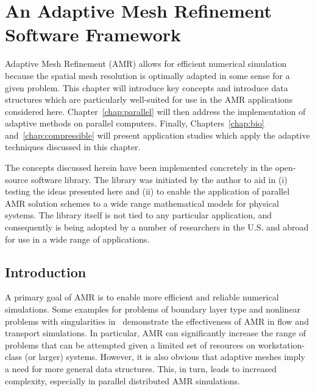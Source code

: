 \chapter{An Adaptive Mesh Refinement Software Framework\label{chap:amr}}

  Adaptive Mesh Refinement (AMR) allows for efficient numerical simulation because the spatial mesh resolution is optimally adapted in some sense for a given problem.   This chapter will introduce key concepts and introduce data structures which are particularly well-suited for use in the AMR applications considered here.  Chapter~\ref{chap:parallel} will then address the implementation of adaptive methods on parallel computers.  Finally, Chapters~\ref{chap:bio} and~\ref{chap:compressible} will present application studies which apply the adaptive techniques discussed in this chapter.

The concepts discussed herein have been implemented concretely in the \libMesh{} open-source software library.  The library was initiated by the author to aid in (i) testing the ideas presented here  and (ii) to enable the application of parallel AMR solution schemes to a wide range  mathematical models for physical systems.  The library itself is not tied to any particular application, and consequently is being adopted by a number of researchers in the U.S. and abroad for use in a wide range of applications.

\section{Introduction}

A primary goal of AMR is to enable more efficient and reliable numerical simulations.  Some
examples for problems of boundary layer type and nonlinear problems
with singularities in~\cite{carey_bail_2004} demonstrate the
effectiveness of AMR in flow and transport simulations. In particular,
AMR can significantly increase the range of problems that can be
attempted given a limited set of resources on workstation-class (or larger) systems.  However, it is also obvious that adaptive
meshes imply a need for more general data structures. This, in turn,
leads to increased complexity, especially in parallel distributed
AMR simulations.

